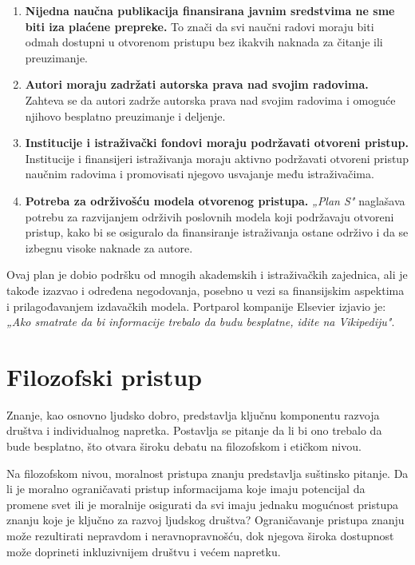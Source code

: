 \documentclass{article}
\begin{document}
\begin{enumerate}
    \item \textbf{Nijedna naučna publikacija finansirana javnim sredstvima ne sme biti iza plaćene prepreke.} To znači da svi naučni radovi moraju biti odmah dostupni u otvorenom pristupu bez ikakvih naknada za čitanje ili preuzimanje.
    \item \textbf{Autori moraju zadržati autorska prava nad svojim radovima.} Zahteva se da autori zadrže autorska prava nad svojim radovima i omoguće njihovo besplatno preuzimanje i deljenje.
    \item \textbf{Institucije i istraživački fondovi moraju podržavati otvoreni pristup.} Institucije i finansijeri istraživanja moraju aktivno podržavati otvoreni pristup naučnim radovima i promovisati njegovo usvajanje među istraživačima.
    \item \textbf{Potreba za održivošću modela otvorenog pristupa.} \textit{„Plan S"} naglašava potrebu za razvijanjem održivih poslovnih modela koji podržavaju otvoreni pristup, kako bi se osiguralo da finansiranje istraživanja ostane održivo i da se izbegnu visoke naknade za autore.
\end{enumerate}

Ovaj plan je dobio podršku od mnogih akademskih i istraživačkih zajednica, ali je takođe izazvao i određena negodovanja, posebno u vezi sa finansijskim aspektima i prilagođavanjem izdavačkih modela. Portparol kompanije Elsevier izjavio je: \textit{„Ako smatrate da bi informacije trebalo da budu besplatne, idite na Vikipediju"}\cite{quote}.



\section{Filozofski pristup}

Znanje, kao osnovno ljudsko dobro, predstavlja ključnu komponentu razvoja društva i individualnog napretka. Postavlja se pitanje da li bi ono trebalo da bude besplatno, što otvara široku debatu na filozofskom i etičkom nivou.

Na filozofskom nivou, moralnost pristupa znanju predstavlja suštinsko pitanje. Da li je moralno ograničavati pristup informacijama koje imaju potencijal da promene svet ili je moralnije osigurati da svi imaju jednaku mogućnost pristupa znanju koje je ključno za razvoj ljudskog društva? Ograničavanje pristupa znanju može rezultirati nepravdom i neravnopravnošću, dok njegova široka dostupnost može doprineti inkluzivnijem društvu i većem napretku. 
\end{document}
